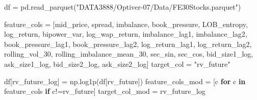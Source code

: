 \documentclass[
  letterpaper,
  DIV=11,
  numbers=noendperiod]{scrartcl}
\newenvironment{Shaded}{\begin{snugshade}}{\end{snugshade}}
\newcommand{\ControlFlowTok}[1]{\textcolor[rgb]{0.00,0.23,0.31}{\textbf{#1}}}
\newcommand{\KeywordTok}[1]{\textcolor[rgb]{0.00,0.23,0.31}{\textbf{#1}}}
\newcommand{\NormalTok}[1]{\textcolor[rgb]{0.00,0.23,0.31}{#1}}
\newcommand{\OperatorTok}[1]{\textcolor[rgb]{0.37,0.37,0.37}{#1}}
\newcommand{\StringTok}[1]{\textcolor[rgb]{0.13,0.47,0.30}{#1}}
\begin{document}
\begin{Shaded}
\begin{Highlighting}[]
\NormalTok{df }\OperatorTok{=}\NormalTok{ pd.read\_parquet(}\StringTok{"DATA3888/Optiver{-}07/Data/FE30Stocks.parquet"}\NormalTok{)}

\NormalTok{feature\_cols }\OperatorTok{=}\NormalTok{ [}\StringTok{\textquotesingle{}mid\_price\textquotesingle{}}\NormalTok{, }\StringTok{\textquotesingle{}spread\textquotesingle{}}\NormalTok{,}
       \StringTok{\textquotesingle{}imbalance\textquotesingle{}}\NormalTok{, }\StringTok{\textquotesingle{}book\_pressure\textquotesingle{}}\NormalTok{, }\StringTok{\textquotesingle{}LOB\_entropy\textquotesingle{}}\NormalTok{, }\StringTok{\textquotesingle{}log\_return\textquotesingle{}}\NormalTok{,}
       \StringTok{\textquotesingle{}bipower\_var\textquotesingle{}}\NormalTok{, }\StringTok{\textquotesingle{}log\_wap\_return\textquotesingle{}}\NormalTok{, }\StringTok{\textquotesingle{}imbalance\_lag1\textquotesingle{}}\NormalTok{, }\StringTok{\textquotesingle{}imbalance\_lag2\textquotesingle{}}\NormalTok{,}
       \StringTok{\textquotesingle{}book\_pressure\_lag1\textquotesingle{}}\NormalTok{, }\StringTok{\textquotesingle{}book\_pressure\_lag2\textquotesingle{}}\NormalTok{, }\StringTok{\textquotesingle{}log\_return\_lag1\textquotesingle{}}\NormalTok{,}
       \StringTok{\textquotesingle{}log\_return\_lag2\textquotesingle{}}\NormalTok{, }\StringTok{\textquotesingle{}rolling\_vol\_30\textquotesingle{}}\NormalTok{, }\StringTok{\textquotesingle{}rolling\_imbalance\_mean\_30\textquotesingle{}}\NormalTok{,}
       \StringTok{\textquotesingle{}sec\_sin\textquotesingle{}}\NormalTok{, }\StringTok{\textquotesingle{}sec\_cos\textquotesingle{}}\NormalTok{, }\StringTok{\textquotesingle{}bid\_size1\_log\textquotesingle{}}\NormalTok{, }\StringTok{\textquotesingle{}ask\_size1\_log\textquotesingle{}}\NormalTok{, }\StringTok{\textquotesingle{}bid\_size2\_log\textquotesingle{}}\NormalTok{,}
       \StringTok{\textquotesingle{}ask\_size2\_log\textquotesingle{}}\NormalTok{]}
\NormalTok{target\_col }\OperatorTok{=} \StringTok{"rv\_future"}

\NormalTok{df[}\StringTok{\textquotesingle{}rv\_future\_log\textquotesingle{}}\NormalTok{] }\OperatorTok{=}\NormalTok{ np.log1p(df[}\StringTok{\textquotesingle{}rv\_future\textquotesingle{}}\NormalTok{])}
\NormalTok{feature\_cols\_mod }\OperatorTok{=}\NormalTok{ [c }\ControlFlowTok{for}\NormalTok{ c }\KeywordTok{in}\NormalTok{ feature\_cols }\ControlFlowTok{if}\NormalTok{ c}\OperatorTok{!=}\StringTok{\textquotesingle{}rv\_future\textquotesingle{}}\NormalTok{] }
\NormalTok{target\_col\_mod     }\OperatorTok{=} \StringTok{\textquotesingle{}rv\_future\_log\textquotesingle{}}
\end{Highlighting}
\end{Shaded}
\end{document}
